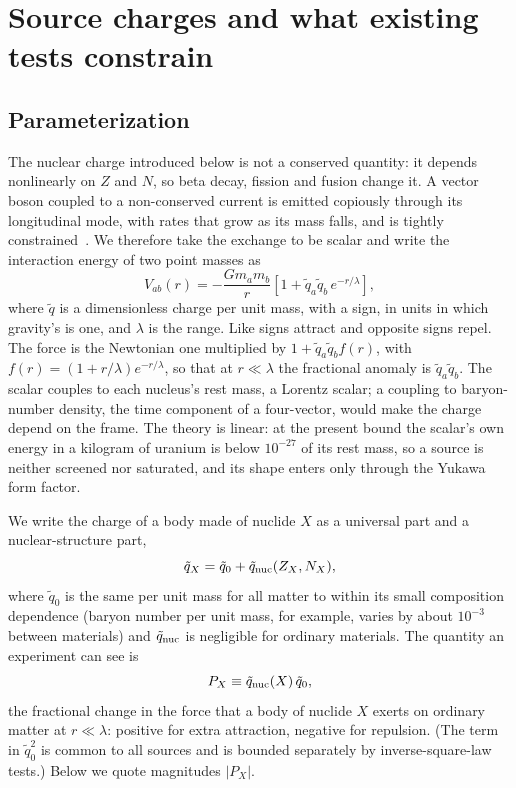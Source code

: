 \documentclass[aps,prd,onecolumn,superscriptaddress,floatfix,nofootinbib]{revtex4-2}
\newcommand{\qt}{\tilde q}
\begin{document}
\section{Source charges and what existing tests constrain}\label{sec:charges}

\subsection{Parameterization}

The nuclear charge introduced below is not a conserved quantity: it depends nonlinearly on $Z$ and $N$, so beta
decay, fission and fusion change it. A vector boson coupled to a non-conserved current is emitted copiously through
its longitudinal mode, with rates that grow as its mass falls, and is tightly constrained~\cite{Dror2017}. We
therefore take the exchange to be scalar and write the interaction energy of two point masses as
\begin{equation}
V_{ab}(r) = -\frac{G m_a m_b}{r}\left[1+\qt_a\qt_b\,e^{-r/\lambda}\right],
\label{eq:V}
\end{equation}
where $\qt$ is a dimensionless charge per unit mass, with a sign, in units in which gravity's is one, and $\lambda$
is the range. Like signs attract and opposite signs repel. The force is the Newtonian one multiplied by
$1+\qt_a\qt_b f(r)$, with $f(r)=(1+r/\lambda)e^{-r/\lambda}$, so that at $r\ll\lambda$ the fractional anomaly is
$\qt_a\qt_b$. The scalar couples to each nucleus's rest mass, a Lorentz scalar; a coupling to baryon-number density,
the time component of a four-vector, would make the charge depend on the frame. The theory is linear: at the
present bound the scalar's own energy in a kilogram of uranium is below $10^{-27}$ of its rest mass, so a source is
neither screened nor saturated, and its shape enters only through the Yukawa form factor.

We write the charge of a body made of nuclide $X$ as a universal part and a nuclear-structure part,
\begin{equation}
\qt_X = \qt_0 + \qt_{\rm nuc}(Z_X,N_X),
\label{eq:split}
\end{equation}
where $\qt_0$ is the same per unit mass for all matter to within its small composition dependence (baryon number per
unit mass, for example, varies by about $10^{-3}$ between materials) and $\qt_{\rm nuc}$ is negligible for ordinary
materials. The quantity an experiment can see is
\begin{equation}
P_X \equiv \qt_{\rm nuc}(X)\,\qt_0 ,
\label{eq:P}
\end{equation}
the fractional change in the force that a body of nuclide $X$ exerts on ordinary matter at $r\ll\lambda$: positive
for extra attraction, negative for repulsion. (The term in $\qt_0^2$ is common to all sources and is bounded
separately by inverse-square-law tests.) Below we quote magnitudes $|P_X|$.
\end{document}
